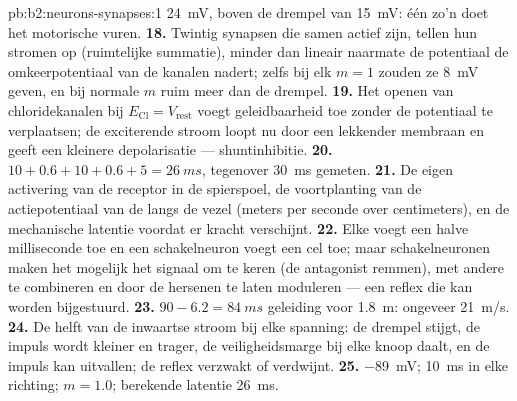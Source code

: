 \begin{solution}{pb:b2:neurons-synapses:1}
\qty{24}{mV}, boven de drempel van \qty{15}{mV}: één zo'n  doet het
motorische  vuren.
\textbf{18.} Twintig synapsen die samen actief zijn, tellen hun stromen op
(ruimtelijke summatie), minder dan lineair naarmate de potentiaal de
omkeerpotentiaal van de kanalen nadert; zelfs bij elk $m = 1$ zouden ze
\qty{8}{mV} geven, en bij normale $m$ ruim meer dan de drempel.
\textbf{19.} Het openen van chloridekanalen bij $E_{\mathrm{Cl}} = V_{\text{rest}}$
voegt geleidbaarheid toe zonder de potentiaal te verplaatsen; de exciterende
stroom loopt nu door een lekkender membraan en geeft een kleinere
depolarisatie --- shuntinhibitie.
\textbf{20.} $10 + 0.6 + 10 + 0.6 + 5 = \qty{26}{ms}$, tegenover
\qty{30}{ms} gemeten.
\textbf{21.} De eigen activering van de receptor in de spierspoel, de
voortplanting van de actiepotentiaal van de  langs de vezel
(meters per seconde over centimeters), en de mechanische latentie voordat er
kracht verschijnt.
\textbf{22.} Elke  voegt een halve milliseconde toe en een
schakelneuron voegt een cel toe; maar schakelneuronen maken het mogelijk het
signaal om te keren (de antagonist remmen), met andere te combineren en door
de hersenen te laten moduleren --- een reflex die kan worden bijgestuurd.
\textbf{23.} $90 - 6.2 = \qty{84}{ms}$ geleiding voor \qty{1.8}{m}:
ongeveer \qty{21}{m/s}.
\textbf{24.} De helft van de inwaartse stroom bij elke spanning: de drempel
stijgt, de impuls wordt kleiner en trager, de veiligheidsmarge bij elke
knoop daalt, en de impuls kan uitvallen; de reflex verzwakt of verdwijnt.
\textbf{25.}  \qty{-89}{mV}; \qty{10}{ms} in elke richting;
$m = 1.0$; berekende latentie \qty{26}{ms}.
\end{solution}
